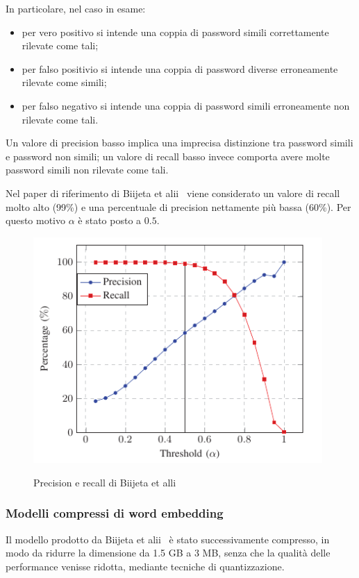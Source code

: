 In particolare, nel caso in esame:
\begin{itemize}
    \item per vero positivo si intende una coppia di password simili correttamente rilevate come tali;
    \item per falso positivio si intende una coppia di password diverse erroneamente rilevate come simili;
    \item per falso negativo si intende una coppia di password simili erroneamente non rilevate come tali.
\end{itemize}
Un valore di precision basso implica una imprecisa distinzione tra password simili e password non simili; un valore di recall basso invece comporta avere molte password simili non rilevate come tali.

Nel paper di riferimento di Biijeta et alii~\cite{biijeta} viene considerato un valore di recall molto alto (99\%) e una percentuale di precision nettamente più bassa (60\%). Per questo motivo $\alpha$ è stato posto a $0.5$.

\begin{figure}[h]
    \centering
    \includegraphics[width=11cm]{./immagini/precision_recall_paper_Biijeta.png}
    \label{precisionbiijeta}
    \caption{Precision e recall di Biijeta et alli~\cite{biijeta}}
\end{figure}
\subsubsection{Modelli compressi di word embedding}
Il modello prodotto da Biijeta et alii~\cite{biijeta} è stato successivamente compresso, in modo da ridurre la dimensione da 1.5 GB a 3 MB, senza che la qualità delle performance venisse ridotta, mediante tecniche di quantizzazione.
